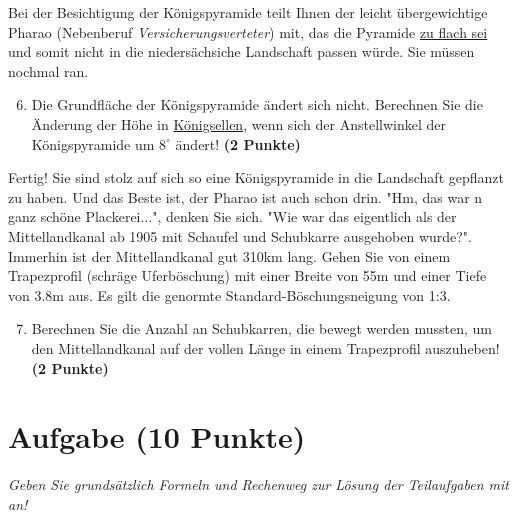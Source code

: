 \documentclass[a4paper, 9pt]{scrartcl}\usepackage[]{graphicx}\usepackage[]{xcolor}
\begin{document}
Bei der Besichtigung der Königspyramide teilt Ihnen der leicht übergewichtige Pharao (Nebenberuf \textit{Versicherungsverteter}) mit, das die Pyramide \underline{zu flach sei} und somit nicht in die niedersächsiche Landschaft passen würde. Sie müssen nochmal ran.

\begin{enumerate}
  \setcounter{enumi}{5}
\item Die Grundfläche der Königspyramide ändert sich nicht. Berechnen Sie die Änderung der Höhe in \underline{Königsellen}, wenn sich der Anstellwinkel der Königspyramide um $8^\circ$ ändert!  \textbf{(2 Punkte)}
\end{enumerate}

Fertig! Sie sind stolz auf sich so eine Königspyramide in die Landschaft gepflanzt zu haben. Und das Beste ist, der Pharao ist auch schon drin. "Hm, das war n ganz schöne Plackerei...", denken Sie sich. "Wie war das eigentlich als der Mittellandkanal ab 1905 mit Schaufel und Schubkarre ausgehoben wurde?". Immerhin ist der Mittellandkanal gut 310km lang. Gehen Sie von einem Trapezprofil (schräge Uferböschung) mit einer Breite von 55m und einer Tiefe von 3.8m aus. Es gilt die genormte Standard-Böschungsneigung von 1:3.

\begin{enumerate}
  \setcounter{enumi}{6}
\item Berechnen Sie die Anzahl an Schubkarren, die bewegt werden mussten, um den Mittellandkanal auf der vollen Länge in einem Trapezprofil auszuheben! \textbf{(2 Punkte)}
\end{enumerate}



\clearpage

\section{Aufgabe \hfill (10 Punkte)}

\textit{Geben Sie grundsätzlich Formeln und Rechenweg zur Lösung der Teilaufgaben mit an!} \\[1Ex]
 
\end{document}
